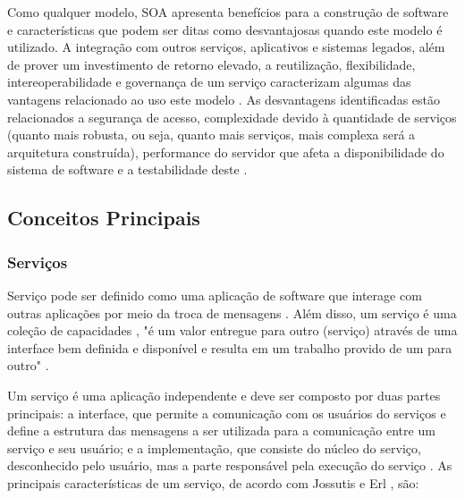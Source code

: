 Como qualquer modelo, SOA apresenta benefícios para a construção de software e características que podem ser ditas como desvantajosas quando este modelo é utilizado. A integração com  outros serviços, aplicativos e sistemas legados, além de prover um investimento de retorno elevado, a reutilização, flexibilidade, intereoperabilidade e governança de um serviço caracterizam algumas das vantagens relacionado ao uso este modelo \cite{oqueesoa_2010} \cite{vantagens_desvantagens_soa}. As desvantagens identificadas estão relacionados a segurança de acesso, complexidade devido à quantidade de serviços (quanto mais robusta, ou seja, quanto mais serviços, mais complexa será a arquitetura construída), performance do servidor que afeta a disponibilidade do sistema de software e a testabilidade deste  \cite{oqueesoa_2010} \cite{vantagens_desvantagens_soa}.

\subsection{Conceitos Principais}
\subsubsection{Serviços}

Serviço pode ser definido como uma aplicação de software que interage com outras aplicações por meio da troca de mensagens \cite{linthicum_soainrealworld_2007}. Além disso, um serviço é uma coleção de capacidades \cite{erl_orientacaoaservico_2009}, "é um valor entregue para outro (serviço) através de uma interface bem definida e disponível e resulta em um trabalho provido de um para outro" \cite{adaptive_ltd_service_2009}.

Um serviço é uma aplicação independente e deve ser composto por duas partes principais: a interface, que permite a comunicação com os usuários do serviços e define a estrutura das mensagens a ser utilizada para a comunicação entre um serviço e seu usuário; e a implementação, que consiste do núcleo do serviço, desconhecido pelo usuário, mas a parte responsável pela execução do serviço \cite{linthicum_soainrealworld_2007} . As principais características de um serviço, de acordo com Jossutis \cite{josuttis_soa_2007} e Erl   \cite{erl_orientacaoaservico_2009}, são:

